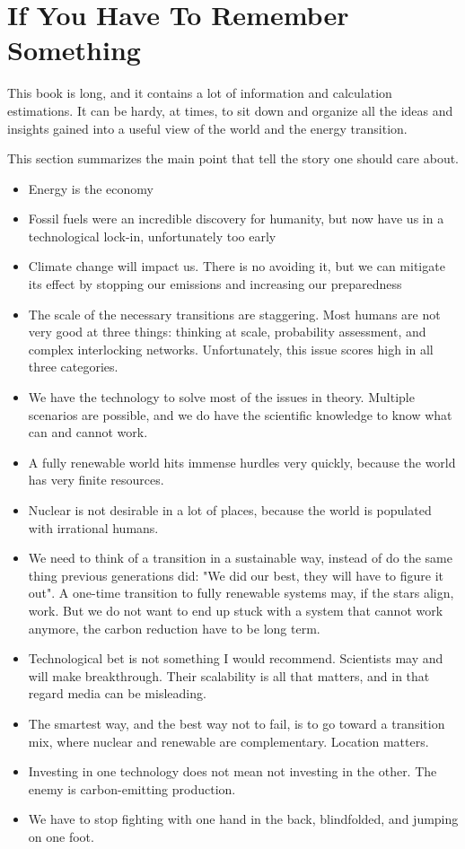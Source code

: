 \chapter*{If You Have To Remember Something}

This book is long, and it contains a lot of information and calculation estimations. It can be hardy, at times, to sit down and organize all the ideas and insights gained into a useful view of the world and the energy transition.

This section summarizes the main point that tell the story one should care about.

\begin{itemize}
\item Energy is the economy
\item Fossil fuels were an incredible discovery for humanity, but now have us in a technological lock-in, unfortunately too early
\item Climate change will impact us. There is no avoiding it, but we can mitigate its effect by stopping our emissions and increasing our preparedness
\item The scale of the necessary transitions are staggering. Most humans are not very good at three things: thinking at scale,  probability assessment, and complex interlocking networks. Unfortunately, this issue scores high in all three categories.
\item We have the technology to solve most of the issues in theory. Multiple scenarios are possible, and we do have the scientific knowledge to know what can and cannot work.
\item A fully renewable world hits immense hurdles very quickly, because the world has very finite resources.
\item Nuclear is not desirable in a lot of places, because the world is populated with irrational humans.
\item We need to think of a transition in a sustainable way, instead of do the same thing previous generations did: "We did our best, they will have to figure it out". A one-time transition to fully renewable systems may, if the stars align, work. But we do not want to end up stuck with a system that cannot work anymore, the carbon reduction have to be long term.
\item Technological bet is not something I would recommend. Scientists may and will make breakthrough. Their scalability is all that matters, and in that regard media can be misleading.
\item The smartest way, and the best way not to fail, is to go toward a transition mix, where nuclear and renewable are complementary. Location matters.
\item Investing in one technology does not mean not investing in the other. The enemy is carbon-emitting production.
\item We have to stop fighting with one hand in the back, blindfolded, and jumping on one foot.
\end{itemize}